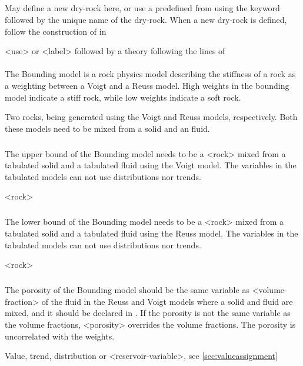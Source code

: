 {\subparagraph{}
 \slist
   \item \Description  May define a new dry-rock here, or use a predefined  from  using the keyword  followed by the unique name of the dry-rock. When a new dry-rock is defined, follow the construction of  in 
   \item \Argument <use> or <label> followed by a theory following the lines of 
   \item \Default
 \elist

\paragraph{}
 \slist
   \item \Description The Bounding model is a rock physics model describing the stiffness of a rock as a weighting between a Voigt and a Reuss model. High weights in the bounding model indicate a stiff rock, while low weights indicate a soft rock.
   \item \Argument Two rocks, being generated using the Voigt and Reuss models, respectively. Both these models need to be mixed from a solid and an fluid.
   \item \Default
 \elist

\subparagraph{}
 \slist
   \item \Description The upper bound of the Bounding model needs to be a <rock> mixed from a tabulated solid and a tabulated fluid using the Voigt model. The variables in the tabulated models can not use distributions nor trends.
   \item \Argument <rock>
   \item \Default
 \elist

\subparagraph{}
 \slist
   \item \Description The lower bound of the Bounding model needs to be a <rock> mixed from a tabulated solid and a tabulated fluid using the Reuss model. The variables in the tabulated models can not use distributions nor trends.
   \item \Argument <rock>
   \item \Default
 \elist

\subparagraph{}
 \slist
   \item \Description The porosity of the Bounding model should be the same variable as <volume-fraction> of the fluid in the Reuss and Voigt models where a solid and fluid are mixed, and it should be declared in . If the porosity is not the same variable as the volume fractions, <porosity> overrides the volume fractions. The porosity is uncorrelated with the weights.
   \item \Argument Value, trend, distribution or <reservoir-variable>, see \autoref{sec:valueassignment}
   \item \Default
 \elist

}
